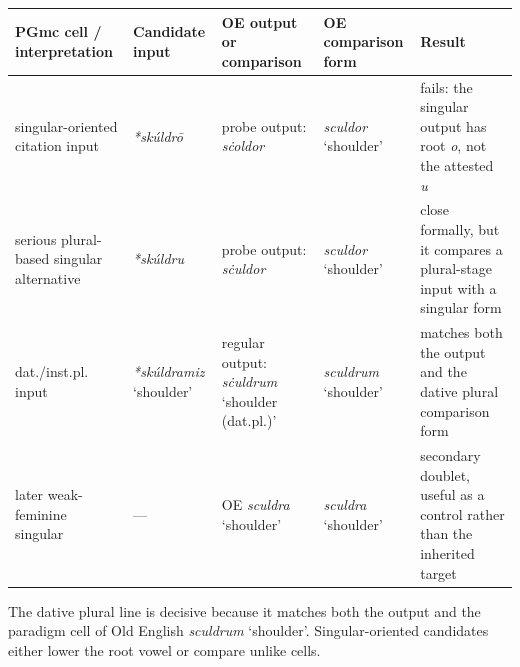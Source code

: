 \documentclass[
  british,
  a4paper,
]{article}
\newcounter{none} %
\providecommand{\Recon}[1]{\emph{*#1}}
\begin{document}
{\def\LTcaptype{none} %
\begin{longtable}[]{@{}
  >{\raggedright\arraybackslash}p{}
  >{\raggedright\arraybackslash}p{}
  >{\raggedright\arraybackslash}p{}
  >{\raggedright\arraybackslash}p{}
  >{\raggedright\arraybackslash}p{}@{}}
\toprule\noalign{}
\begin{minipage}[b]{\linewidth}\raggedright
PGmc cell / interpretation
\end{minipage} & \begin{minipage}[b]{\linewidth}\raggedright
Candidate input
\end{minipage} & \begin{minipage}[b]{\linewidth}\raggedright
OE output or comparison
\end{minipage} & \begin{minipage}[b]{\linewidth}\raggedright
OE comparison form
\end{minipage} & \begin{minipage}[b]{\linewidth}\raggedright
Result
\end{minipage} \\
\midrule\noalign{}
\endhead
\bottomrule\noalign{}
\endlastfoot
singular-oriented citation input & {\emph{*skúldrō}} & probe output:
{\emph{sċoldor}} & {\emph{sculdor}} `shoulder' & fails: the singular
output has root \emph{o}, not the attested \emph{u} \\
serious plural-based singular alternative & {\emph{*skúldru}} & probe
output: {\emph{sċuldor}} & {\emph{sculdor}} `shoulder' & close formally,
but it compares a plural-stage input with a singular form \\
dat./inst.pl. input & \Recon{skúldramiz} `shoulder' & regular output:
{\emph{sċuldrum}} `shoulder (dat.pl.)' & {\emph{sculdrum}} `shoulder' &
matches both the output and the dative plural comparison form \\
later weak-feminine singular & --- & OE {\emph{sculdra}} `shoulder' &
{\emph{sculdra}} `shoulder' & secondary doublet, useful as a control
rather than the inherited target \\
\end{longtable}
}

The dative plural line is decisive because it matches both the output
and the paradigm cell of Old English {\emph{sculdrum}} `shoulder'.
Singular-oriented candidates either lower the root vowel or compare
unlike cells.
\end{document}
